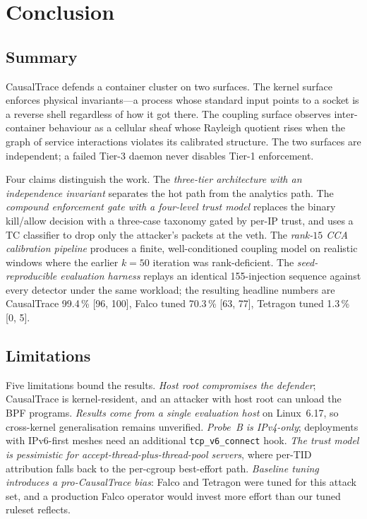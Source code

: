 \chapter{Conclusion}
\label{Chapter7}

\section{Summary}
\label{sec:conclusion-summary}

CausalTrace defends a container cluster on two surfaces. The kernel
surface enforces physical invariants---a process whose standard input
points to a socket is a reverse shell regardless of how it got there. The
coupling surface observes inter-container behaviour as a cellular sheaf
whose Rayleigh quotient rises when the graph of service interactions
violates its calibrated structure. The two surfaces are independent; a
failed Tier-3 daemon never disables Tier-1 enforcement.

Four claims distinguish the work. The \emph{three-tier architecture with
an independence invariant} separates the hot path from the analytics
path. The \emph{compound enforcement gate with a four-level trust model}
replaces the binary kill/allow decision with a three-case taxonomy gated
by per-IP trust, and uses a TC classifier to drop only the attacker's
packets at the veth. The \emph{rank-$15$ CCA calibration pipeline}
produces a finite, well-conditioned coupling model on realistic windows
where the earlier $k{=}50$ iteration was rank-deficient. The
\emph{seed-reproducible evaluation harness} replays an identical
155-injection sequence against every detector under the same workload;
the resulting headline numbers are CausalTrace 99.4\,\% [96, 100],
Falco tuned 70.3\,\% [63, 77], Tetragon tuned 1.3\,\% [0, 5].

\section{Limitations}
\label{sec:conclusion-limitations}

Five limitations bound the results. \emph{Host root compromises the
defender}; CausalTrace is kernel-resident, and an attacker with host root
can unload the BPF programs. \emph{Results come from a single evaluation
host} on Linux~6.17, so cross-kernel generalisation remains unverified.
\emph{Probe~B is IPv4-only}; deployments with IPv6-first meshes need an
additional \texttt{tcp\_v6\_connect} hook. \emph{The trust model is
pessimistic for accept-thread-plus-thread-pool servers}, where per-TID
attribution falls back to the per-cgroup best-effort path. \emph{Baseline
tuning introduces a pro-CausalTrace bias}: Falco and Tetragon were tuned
for this attack set, and a production Falco operator would invest more
effort than our tuned ruleset reflects.

